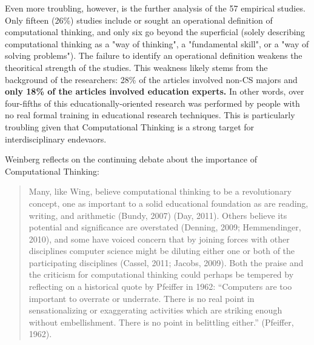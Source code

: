 Even more troubling, however, is the further analysis of the 57 empirical studies.
Only fifteen (26\%) studies include or sought an operational definition of computational thinking, and only six go beyond the superficial (solely describing computational thinking as a "way of thinking", a "fundamental skill", or a "way of solving problems"). 
The failure to identify an operational definition weakens the theoritical strength of the studies.
This weakness likely stems from the background of the researchers: 28\% of the articles involved non-CS majors and \textbf{only 18\% of the articles involved education experts.} 
In other words, over four-fifths of this educationally-oriented research was performed by people with no real formal training in educational research techniques.
This is particularly troubling given that Computational Thinking is a strong target for interdisciplinary endevaors.

Weinberg reflects on the continuing debate about the importance of Computational Thinking:
\begin{quote}
    Many, like Wing, believe computational thinking to be a revolutionary concept, one as 
important to a solid educational foundation as are reading, writing, and arithmetic (Bundy, 2007\cite{bundy2007}) 
(Day, 2011\cite{day2011}). Others believe its potential and significance are overstated (Denning, 2009\cite{denning2009}; 
Hemmendinger, 2010\cite{hemmendinger2010}), and some have voiced concern that by joining forces with other 
disciplines computer science might be diluting either one or both of the participating disciplines 
(Cassel, 2011\cite{cassel2011}; Jacobs, 2009\cite{jacobs2009}). Both the praise and the criticism for computational thinking could 
perhaps be tempered by reflecting on a historical quote by Pfeiffer in 1962: “Computers are too 
important to overrate or underrate. There is no real point in sensationalizing or exaggerating 
activities which are striking enough without embellishment. There is no point in belittling 
either.” (Pfeiffer, 1962\cite{pfeiffer1962}).
\end{quote}

